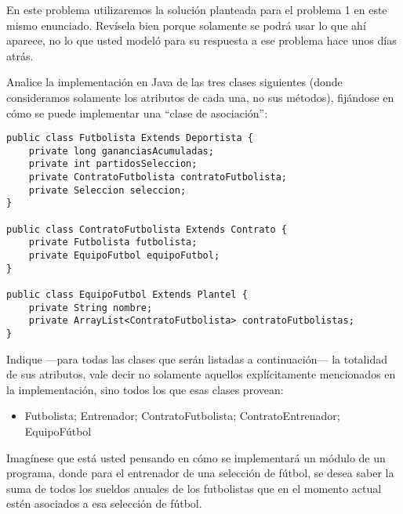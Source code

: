 \documentclass[11pt,letterpaper]{article}
\begin{document}
\begin{spacing}{1.2}
\begin{NewAnswer}
\begin{ProbPart}
\end{ProbPart}

\end{NewAnswer}

\newpage

\begin{Problem}

    En este problema utilizaremos la solución planteada para el problema 1 en este mismo enunciado.
    Revísela bien porque solamente se podrá usar lo que ahí aparece, no lo que usted modeló para su respuesta a
    ese problema hace unos días atrás.

\begin{ProbPart}

    Analice la implementación en Java de las tres clases siguientes (donde consideramos solamente los
    atributos de cada una, no sus métodos), fijándose en cómo se puede
implementar una ``clase de asociación'':

    \begin{lstlisting}
public class Futbolista Extends Deportista {
    private long gananciasAcumuladas;
    private int partidosSeleccion;
    private ContratoFutbolista contratoFutbolista;
    private Seleccion seleccion;
}

public class ContratoFutbolista Extends Contrato {
    private Futbolista futbolista;
    private EquipoFutbol equipoFutbol;
}

public class EquipoFutbol Extends Plantel {
    private String nombre;
    private ArrayList<ContratoFutbolista> contratoFutbolistas;
}
    \end{lstlisting}

Indique ---para todas las clases que serán listadas a continuación--- la totalidad de sus atributos,
vale decir no solamente aquellos explícitamente mencionados en la implementación, sino todos los
que esas clases provean:

\begin{itemize}[itemsep=0pt]
    \item Futbolista; Entrenador; ContratoFutbolista; ContratoEntrenador; EquipoFútbol
\end{itemize}

\end{ProbPart}

\begin{ProbPart}

Imagínese que está usted pensando en cómo se implementará un módulo de un programa, donde
para el entrenador de una selección de fútbol, se desea saber la suma de todos los sueldos anuales de los
futbolistas que en el momento actual estén asociados a esa selección de fútbol.


\end{ProbPart}
\end{Problem}
\end{spacing}
\end{document}

